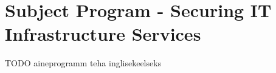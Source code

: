 \chapter{Subject Program - Securing IT Infrastructure Services}
\label{appendix:SubjecProgram}

{\color{red} TODO aineprogramm teha inglisekeelseks }


%
